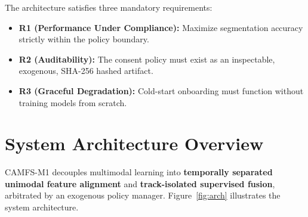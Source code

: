\documentclass[10pt,a4paper]{article}
\begin{document}
The architecture satisfies three mandatory requirements:
\begin{itemize}[itemsep=1pt, topsep=1pt]
    \item \textbf{R1 (Performance Under Compliance):} Maximize segmentation accuracy strictly within the policy boundary.
    \item \textbf{R2 (Auditability):} The consent policy must exist as an inspectable, exogenous, SHA-256 hashed artifact.
    \item \textbf{R3 (Graceful Degradation):} Cold-start onboarding must function without training models from scratch.
\end{itemize}

\section{System Architecture Overview}

CAMFS-M1 decouples multimodal learning into \textbf{temporally separated unimodal feature alignment} and \textbf{track-isolated supervised fusion}, arbitrated by an exogenous policy manager. Figure~\ref{fig:arch} illustrates the system architecture.
\end{document}
